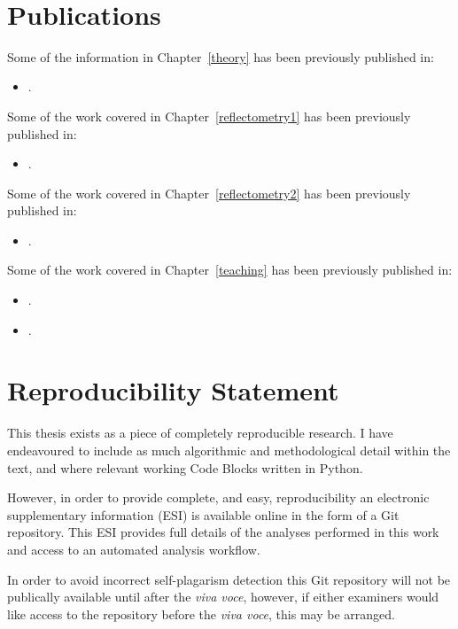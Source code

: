 \documentclass[twoside,symmetric,nobib]{./arm-thesis}
\newcommand{\blankpage}{\newpage\hbox{}\thispagestyle{empty}\newpage}
\begin{document}
\blankpage
\begin{fullwidth}
\thispagestyle{empty}
\setlength{\parindent}{0pt}
\setlength{\parskip}{\baselineskip}
~\vfill

\chapter*{Publications}
Some of the information in Chapter~\ref{theory} has been previously published in:
\begin{itemize}
  \item \cite{mccluskey_model-dependent_2018}.
\end{itemize}
Some of the work covered in Chapter~\ref{reflectometry1} has been previously published in:
\begin{itemize}
  \item \cite{mccluskey_bayesian_2019}.
\end{itemize}
Some of the work covered in Chapter~\ref{reflectometry2} has been previously published in:
\begin{itemize}
  \item \cite{mccluskey_assessing_2019}.
\end{itemize}
Some of the work covered in Chapter~\ref{teaching} has been previously published in:
\begin{itemize}
  \item \cite{mccluskey_pylj_2018}.
  \item \cite{mccluskey_introduction_2019}.
\end{itemize}

\chapter*{Reproducibility Statement}
This thesis exists as a piece of completely reproducible research.
I have endeavoured to include as much algorithmic and methodological detail within the text, and where relevant working Code Blocks written in Python.

However, in order to provide complete, and easy, reproducibility an electronic supplementary information (ESI) is available online in the form of a Git repository.
This ESI provides full details of the analyses performed in this work and access to an automated analysis workflow.

In order to avoid incorrect self-plagarism detection this Git repository will not be publically available until after the \emph{viva voce}, however, if either examiners would like access to the repository before the \emph{viva voce}, this may be arranged.


~\vfill
\end{fullwidth}
\end{document}
